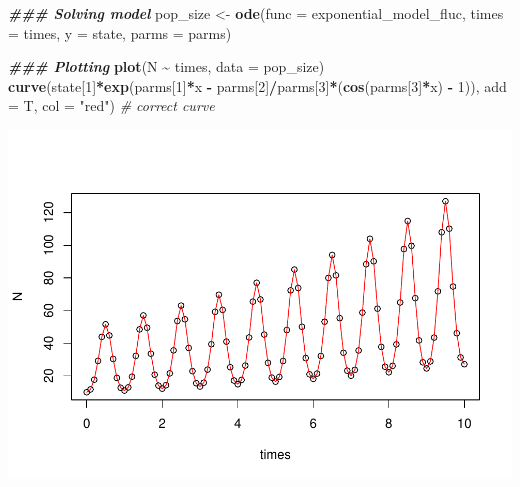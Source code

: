 \documentclass[
]{book}
\newenvironment{Shaded}{\begin{snugshade}}{\end{snugshade}}
\newcommand{\AttributeTok}[1]{\textcolor[rgb]{0.13,0.29,0.53}{#1}}
\newcommand{\CommentTok}[1]{\textcolor[rgb]{0.56,0.35,0.01}{\textit{#1}}}
\newcommand{\DecValTok}[1]{\textcolor[rgb]{0.00,0.00,0.81}{#1}}
\newcommand{\DocumentationTok}[1]{\textcolor[rgb]{0.56,0.35,0.01}{\textbf{\textit{#1}}}}
\newcommand{\FunctionTok}[1]{\textcolor[rgb]{0.13,0.29,0.53}{\textbf{#1}}}
\newcommand{\NormalTok}[1]{#1}
\newcommand{\OtherTok}[1]{\textcolor[rgb]{0.56,0.35,0.01}{#1}}
\newcommand{\SpecialCharTok}[1]{\textcolor[rgb]{0.81,0.36,0.00}{\textbf{#1}}}
\newcommand{\StringTok}[1]{\textcolor[rgb]{0.31,0.60,0.02}{#1}}
\begin{document}
\begin{Shaded}
\begin{Highlighting}[]
\DocumentationTok{\#\#\# Solving model}
\NormalTok{pop\_size }\OtherTok{\textless{}{-}} \FunctionTok{ode}\NormalTok{(}\AttributeTok{func =}\NormalTok{ exponential\_model\_fluc, }\AttributeTok{times =}\NormalTok{ times, }\AttributeTok{y =}\NormalTok{ state, }\AttributeTok{parms =}\NormalTok{ parms)}

\DocumentationTok{\#\#\# Plotting}
\FunctionTok{plot}\NormalTok{(N }\SpecialCharTok{\textasciitilde{}}\NormalTok{ times, }\AttributeTok{data =}\NormalTok{ pop\_size)}
\FunctionTok{curve}\NormalTok{(state[}\DecValTok{1}\NormalTok{]}\SpecialCharTok{*}\FunctionTok{exp}\NormalTok{(parms[}\DecValTok{1}\NormalTok{]}\SpecialCharTok{*}\NormalTok{x }\SpecialCharTok{{-}}\NormalTok{ parms[}\DecValTok{2}\NormalTok{]}\SpecialCharTok{/}\NormalTok{parms[}\DecValTok{3}\NormalTok{]}\SpecialCharTok{*}\NormalTok{(}\FunctionTok{cos}\NormalTok{(parms[}\DecValTok{3}\NormalTok{]}\SpecialCharTok{*}\NormalTok{x) }\SpecialCharTok{{-}} \DecValTok{1}\NormalTok{)), }\AttributeTok{add =}\NormalTok{ T, }\AttributeTok{col =} \StringTok{"red"}\NormalTok{) }\CommentTok{\# correct curve}
\end{Highlighting}
\end{Shaded}

\includegraphics{bookdown-demo_files/figure-latex/unnamed-chunk-12-2.pdf}

  
\end{document}
